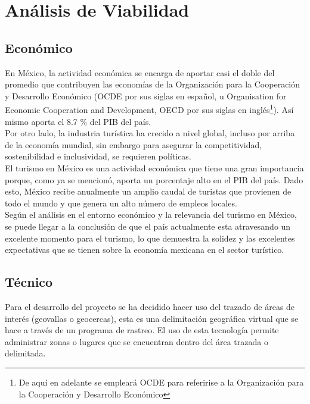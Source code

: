 \section{Análisis de Viabilidad}

\subsection{Económico}

En México, la actividad económica se encarga de aportar casi el doble del promedio que contribuyen las economías de la Organización para la Cooperación y Desarrollo Económico (OCDE por sus siglas en español, u Organisation for Economic Cooperation and Development, OECD por sus siglas en inglés\footnote{De aquí en adelante se empleará OCDE para referirise a la Organización para la Cooperación y Desarrollo Económico}). Así mismo aporta el 8.7 \% del PIB del país\cite{ocde}. \\

Por otro lado, la industria turística ha crecido a nivel global, incluso por arriba de la economía mundial, sin embargo para asegurar la competitividad, sostenibilidad e inclusividad, se requieren políticas\cite{turismoEnMexico}.\\ 

El turismo en México es una actividad económica que tiene una gran importancia porque, como ya se mencionó, aporta un porcentaje alto en el PIB del país. Dado esto, México recibe anualmente un amplio caudal de turistas que provienen de todo el mundo y que genera un alto número de empleos locales\cite{importanciaTurismo}. \\

Según el análisis en el entorno económico y la relevancia del turismo en México, se puede llegar a la conclusión de que el país actualmente esta atravesando un excelente momento para el turismo, lo que demuestra la solidez y las excelentes expectativas que se tienen sobre la economía mexicana en el sector turístico.\\

\subsection{Técnico}

Para el desarrollo del proyecto se ha decidido hacer uso del trazado de áreas de interés (geovallas o geocercas), esta es una delimitación geográfica virtual que se hace a través de un programa de rastreo. El uso de esta tecnología permite administrar zonas o lugares que se encuentran dentro del área trazada o delimitada\cite{geovalla}. \\

